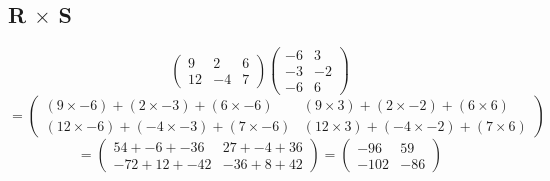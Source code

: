 \documentclass[a4paper,12pt]{article}
\begin{document}
      \subsection{R $\times$ S}
        \begin{equation}
          \begin{pmatrix}
            9 & 2 & 6\\
            12 & -4 & 7
          \end{pmatrix}
          \begin{pmatrix}
            -6 & 3\\
            -3 & -2\\
            -6 & 6
          \end{pmatrix}
        \end{equation}
        \begin{equation}
          =
          \begin{pmatrix}
            ( 9 \times -6) + ( 2 \times -3) + (6 \times -6) & ( 9 \times 3) + ( 2 \times -2) + (6 \times 6)\\
            (12 \times -6) + (-4 \times -3) + (7 \times -6) & (12 \times 3) + (-4 \times -2) + (7 \times 6)
          \end{pmatrix}
        \end{equation}
        \begin{equation}
          =
          \begin{pmatrix}
             54 + -6 + -36 &  27 + -4 + 36\\
            -72 + 12 + -42 & -36 +  8 + 42
          \end{pmatrix}
          =
          \begin{pmatrix}
             -96 & 59\\
            -102 & -86
          \end{pmatrix}
        \end{equation}
\end{document}
